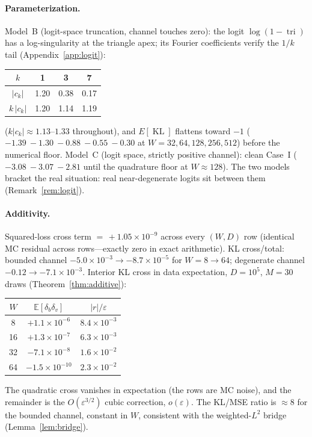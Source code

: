 \documentclass[12pt]{article}
\newcommand{\eps}{\varepsilon}
\newcommand{\KL}{\operatorname{KL}}
\newcommand{\E}{\mathbb{E}}
\theoremstyle{remark}
\begin{document}
\paragraph{Parameterization.}
Model~B (logit-space truncation, channel touches zero): the logit
$\log(1-\operatorname{tri})$ has a log-singularity at the triangle apex; its
Fourier coefficients verify the $1/k$ tail (Appendix~\ref{app:logit}):
\begin{center}
\begin{tabular}{cccc}
\toprule
$k$ & 1 & 3 & 7 \\
\midrule
$|c_k|$ & 1.20 & 0.38 & 0.17 \\
$k\,|c_k|$ & 1.20 & 1.14 & 1.19 \\
\bottomrule
\end{tabular}
\end{center}
($k|c_k|\approx1.13$--$1.33$ throughout), and $E[\KL]$ flattens toward $-1$
($-1.39\ -1.30\ -0.88\ -0.55\ -0.30$ at $W=32,64,128,256,512$) before the
numerical floor. Model~C (logit space, strictly positive channel): clean
Case~I ($-3.08\ -3.07\ -2.81$ until the quadrature floor at $W\approx128$).
The two models bracket the real situation: real near-degenerate logits sit
between them (Remark~\ref{rem:logit}).

\paragraph{Additivity.}
Squared-loss cross term $=\,+1.05\times10^{-9}$ across every $(W,D)$ row
(identical MC residual across rows---exactly zero in exact arithmetic).
KL cross/total: bounded channel $-5.0\times10^{-3}\to-8.7\times10^{-5}$ for
$W=8\to64$; degenerate channel $-0.12\to-7.1\times10^{-3}$. Interior KL cross
in data expectation, $D=10^5$, $M=30$ draws (Theorem~\ref{thm:additive}):
\begin{center}
\begin{tabular}{ccc}
\toprule
$W$ & $\E[\delta_b\delta_v]$ & $|r|/\eps$ \\
\midrule
8  & $+1.1\times10^{-6}$ & $8.4\times10^{-3}$ \\
16 & $+1.3\times10^{-7}$ & $6.3\times10^{-3}$ \\
32 & $-7.1\times10^{-8}$ & $1.6\times10^{-2}$ \\
64 & $-1.5\times10^{-10}$ & $2.3\times10^{-2}$ \\
\bottomrule
\end{tabular}
\end{center}
The quadratic cross vanishes in expectation (the rows are MC noise), and the
remainder is the $O(\eps^{3/2})$ cubic correction, $o(\eps)$. The KL/MSE ratio
is $\approx8$ for the bounded channel, constant in $W$, consistent with the
weighted-$L^2$ bridge (Lemma~\ref{lem:bridge}).
\end{document}
